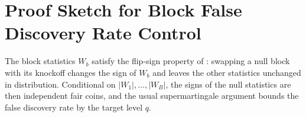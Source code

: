 \chapter{Proof Sketch for Block False Discovery Rate Control}
\label{app:a}

The block statistics $W_b$ satisfy the flip-sign property of \citet{barber2015}: swapping a
null block with its knockoff changes the sign of $W_b$ and leaves the other statistics
unchanged in distribution. Conditional on $|W_1|, \dots, |W_B|$, the signs of the null
statistics are then independent fair coins, and the usual supermartingale argument bounds the
false discovery rate by the target level $q$.
